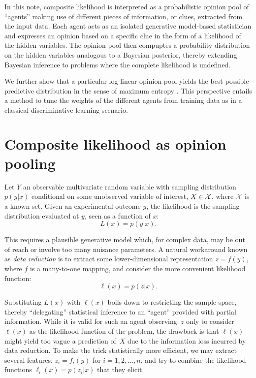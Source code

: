 \documentclass[english]{scrartcl}
\begin{document}
In this note, composite likelihood is interpreted as a probabilistic opinion pool of ``agents'' making use of different pieces of information, or clues, extracted from the input data. Each agent acts as an isolated generative model-based statistician and expresses an opinion based on a specific clue in the form of a likelihood of the hidden variables. The opinion pool then compuptes a probability distribution on the hidden variables analogous to a Bayesian posterior, thereby extending Bayesian inference to problems where the complete likelihood is undefined.

We further show that a particular log-linear opinion pool yields the best possible predictive distribution in the sense of maximum entropy \cite{Grunwald-04}. This perspective entails a method to tune the weights of the different agents from training data as in a classical discriminative learning scenario.


\section{Composite likelihood as opinion pooling}
\label{sec:pool}

Let $Y$ an observable multivariate random variable with sampling distribution $p(y|x)$ conditional on some unobserved variable of interest, $X\in{\cal X}$, where ${\cal X}$ is a known set. Given an experimental outcome $y$, the likelihood is the sampling distribution evaluated at $y$, seen as a function of $x$:
$$
L(x) = p(y|x)
.
$$

This requires a plausible generative model which, for complex data, may be out of reach or involve too many nuisance parameters. A natural workaround known as {\em data reduction} is to extract some lower-dimensional representation $z=f(y)$, where $f$ is a many-to-one mapping, and consider the more convenient likelihood function:
$$
\ell(x) = p(z|x)
.
$$

Substituting $L(x)$ with $\ell(x)$ boils down to restricting the sample space, thereby  ``delegating'' statistical inference to an ``agent'' provided with partial information. While it is valid for such an agent observing~$z$ only to consider $\ell(x)$ as the likelihood function of the problem, the drawback is that $\ell(x)$ might yield too vague a prediction of~$X$ due to the information loss incurred by data reduction. To make the trick statistically more efficient, we may extract several features, $z_i=f_i(y)$ for $i=1,2,\ldots,n$, and try to combine the likelihood functions $\ell_i(x) = p(z_i|x)$ that they elicit.
\end{document}
